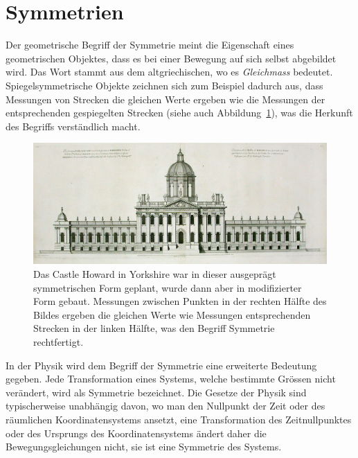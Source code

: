 %
%
%
\section{Symmetrien
\label{buch:section:symmetrien}}
Der geometrische Begriff der Symmetrie meint die Eigenschaft eines
geometrischen Objektes, dass es bei einer Bewegung auf sich selbst
abgebildet wird.
Das Wort stammt aus dem altgriechischen, wo es {\em Gleichmass}
bedeutet.
Spiegelsymmetrische Objekte zeichnen sich zum Beispiel dadurch aus,
dass Messungen von Strecken die gleichen Werte ergeben wie die Messungen
der entsprechenden gespiegelten Strecken (siehe auch
Abbildung~\ref{buch:lie:bild:castlehoward}), was die Herkunft des
Begriffs verständlich macht.
\begin{figure}
\centering
\includegraphics[width=\textwidth]{chapters/60-gruppen/images/castle.jpeg}
\caption{Das Castle Howard in Yorkshire war in dieser ausgeprägt symmetrischen
Form geplant, wurde dann aber in modifizierter Form gebaut.
Messungen zwischen Punkten in der rechten Hälfte des Bildes
ergeben die gleichen Werte wie Messungen entsprechenden Strecken
in der linken Hälfte, was den Begriff Symmetrie rechtfertigt.
\label{buch:lie:bild:castlehoward}}
\end{figure}

In der Physik wird dem Begriff der Symmetrie eine erweiterte
Bedeutung gegeben.
Jede Transformation eines Systems, welche bestimmte Grössen nicht
verändert, wird als Symmetrie bezeichnet.
Die Gesetze der Physik sind typischerweise unabhängig davon, wo man
den Nullpunkt der Zeit oder des räumlichen Koordinatensystems ansetzt,
eine Transformation des Zeitnullpunktes oder des Ursprungs des
Koordinatensystems ändert daher die Bewegungsgleichungen nicht, sie ist
eine Symmetrie des Systems.

